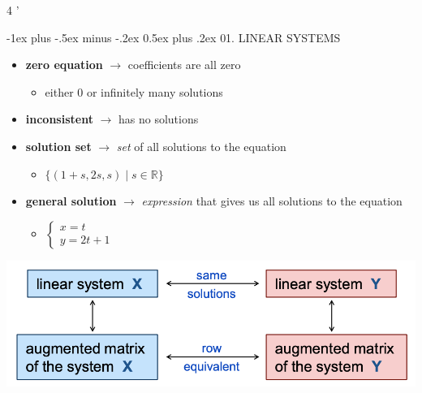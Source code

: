 \documentclass[10pt, landscape]{article}
\makeatletter
\renewcommand{\section}{\@startsection{section}{1}{0mm}%
                                {-1ex plus -.5ex minus -.2ex}%
                                {0.5ex plus .2ex}%
                                {\normalfont\large\bfseries}}
\let\then\rightarrow
\makeatother
\begin{document}
\raggedright
\footnotesize
\begin{multicols*}{4
    '}


\setlength{\columnseprule}{0.25pt}
\setlength{\premulticols}{1pt}
\setlength{\postmulticols}{1pt}
\setlength{\multicolsep}{1pt}
\setlength{\columnsep}{2pt}

\begin{center}
\end{center}

\section{01. LINEAR SYSTEMS}
\begin{itemize}
  \item \textbf{zero equation} $\then$ coefficients are all zero 
  \begin{itemize}
    \item either 0 or infinitely many solutions
  \end{itemize}
  \item \textbf{inconsistent} $\then$ has no solutions
  \item \textbf{solution set} $\then$ \textit{set} of all solutions to the equation
  \begin{itemize}
    \item $\{(1+s, 2s, s) \mid s \in \mathbb{R} \}$
  \end{itemize}
  \item \textbf{general solution} $\then$ \textit{expression} that gives us all solutions to the equation
  \begin{itemize}
    \item $\begin{cases}
      x=t
      \\ y = 2t + 1
    \end{cases}$
  \end{itemize}
\end{itemize}
\begin{center}
  \includegraphics[width=0.9\linewidth]{ma1101r-ch1-1.png}
\end{center}


\end{multicols*}
\end{document}
